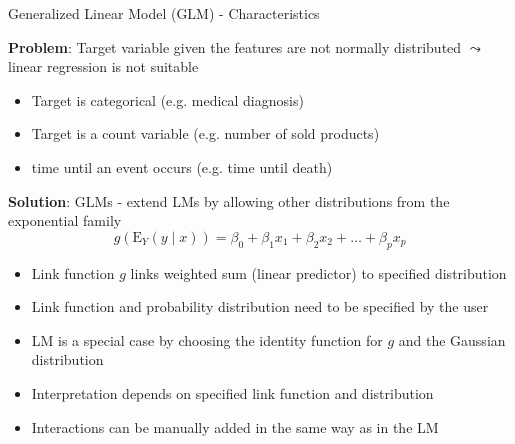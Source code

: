 \documentclass[11pt,compress,t,notes=noshow, aspectratio=169, xcolor=table]{beamer}
\begin{document}
\begin{frame}{Generalized Linear Model (GLM) - Characteristics}

\textbf{Problem}: Target variable given the features are not normally distributed $\leadsto$ linear regression is not suitable
\begin{itemize}
    \item Target is categorical (e.g. medical diagnosis)
    \item Target is a count variable (e.g. number of sold products)
    \item time until an event occurs (e.g. time until death)
\end{itemize}
\medskip
\textbf{Solution}: GLMs - extend LMs by allowing other distributions from the exponential family
$$g(\mathrm{E}_Y (y\mid x)) = \beta_0 + \beta_1 x_1 + \beta_2 x_2 + \ldots + \beta_p x_p$$
\vspace*{-0.4cm}
    \begin{itemize}
        \item Link function $g$ links weighted sum (linear predictor) to specified distribution
        \item Link function and probability distribution need to be specified by the user
        \item LM is a special case by choosing the identity function for $g$ and the Gaussian distribution
        \item Interpretation depends on specified link function and distribution
        \item Interactions can be manually added in the same way as in the LM
    \end{itemize}
    
    
    
    
\end{frame}
 	
\end{document}
